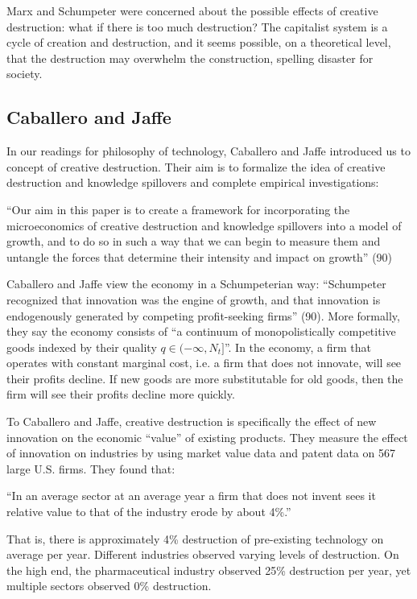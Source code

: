 \documentclass[11pt]{article}
\begin{document}
Marx and Schumpeter were concerned about the possible effects of creative destruction: what if there is too much destruction?
The capitalist system is a cycle of creation and destruction, and it seems possible, on a theoretical level, that the destruction may overwhelm the construction, spelling disaster for society.

\subsection{Caballero and Jaffe}
In our readings for philosophy of technology, Caballero and Jaffe introduced us to concept of creative destruction.
Their aim is to formalize the idea of creative destruction and knowledge spillovers and complete empirical investigations:
\begin{displayquote}
    ``Our aim in this paper is to create a framework for incorporating the microeconomics of creative destruction and knowledge spillovers into a model of growth, and to do so in such a way that we can begin to measure them and untangle the forces that determine their intensity and impact on growth'' \cite{jaffe} (90)
\end{displayquote}

Caballero and Jaffe view the economy in a Schumpeterian way: ``Schumpeter recognized that innovation was the engine of growth, and that innovation is endogenously generated by competing profit-seeking firms'' (90). 
More formally, they say the economy consists of ``a continuum of monopolistically competitive goods indexed by their quality $q \in (-\infty, N_t]$''.
In the economy, a firm that operates with constant marginal cost, i.e. a firm that does not innovate, will see their profits decline. 
If new goods are more substitutable for old goods, then the firm will see their profits decline more quickly.

To Caballero and Jaffe, creative destruction is specifically the effect of new innovation on the economic ``value'' of existing products.
They measure the effect of innovation on industries by using market value data and patent data on 567 large U.S. firms.
They found that:
\begin{displayquote}
    ``In an average sector at an average year a firm that does not invent sees it relative value to that of the industry erode by about 4\%.'' \cite{jaffe}
\end{displayquote}
That is, there is approximately 4\% destruction of pre-existing technology on average per year. 
Different industries observed varying levels of destruction.
On the high end, the pharmaceutical industry observed 25\% destruction per year, yet multiple sectors observed 0\% destruction.
\end{document}
